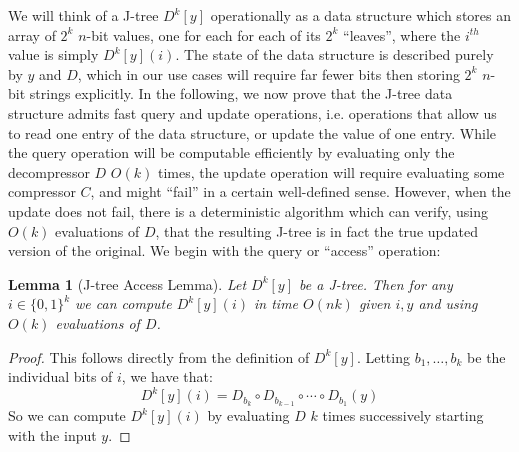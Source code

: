 \documentclass[11pt]{article}
\newtheorem{lemma}{Lemma}
\newcommand{\B}{\{0,1\}}
\begin{document}
We will think of a J-tree $D^k[y]$ operationally as a data structure which stores an array of $2^k$ $n$-bit values, one for each for each of its $2^k$ ``leaves'', where the $i^{th}$ value is simply $D^k[y](i)$. The state of the data structure is described purely by $y$ and $D$, which in our use cases will require far fewer bits then storing $2^k$ $n$-bit strings explicitly. In the following, we now prove that the J-tree data structure admits fast query and update operations, i.e. operations that allow us to read one entry of the data structure, or update the value of one entry. While the query operation will be computable efficiently by evaluating only the decompressor $D$ $O(k)$ times, the update operation will require evaluating some compressor $C$, and might ``fail'' in a certain well-defined sense. However, when the update does not fail, there is a deterministic algorithm which can verify, using $O(k)$ evaluations of $D$, that the resulting J-tree is in fact the true updated version of the original. We begin with the query or ``access'' operation: 
\begin{lemma}[J-tree Access Lemma]\label{lem:access}
Let $D^k[y]$ be a J-tree. Then for any $i \in \B^k$ we can compute $D^k[y](i)$ in time $O(n k)$ given $i,y$ and using $O(k)$ evaluations of $D$.
\end{lemma}
\begin{proof}
This follows directly from the definition of $D^k[y]$. Letting $b_1, \ldots, b_k$ be the individual bits of $i$, we have that:
\[
D^k[y](i) = D_{b_k} \circ D_{b_{k-1}} \circ \cdots \circ D_{b_1} (y)
\]
So we can compute $D^k[y](i)$ by evaluating $D$ $k$ times successively starting with the input $y$.
\end{proof}
\end{document}
